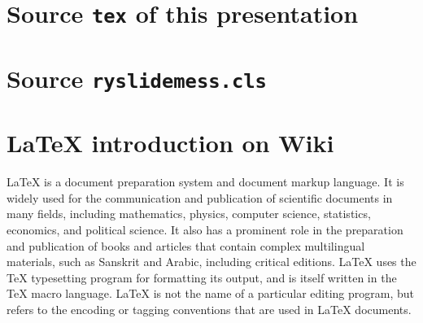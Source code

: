 \documentclass{ryslidemess}
\begin{document}
\newpage\section{Source {\tt tex} of this presentation}
\newpage\section{Source {\tt ryslidemess.cls}}
\newpage\section{\LaTeX{} introduction on Wiki}
\LaTeX{} is a document preparation system and document markup language.
It is widely used for the communication and publication of scientific documents in many fields,
including mathematics, physics, computer science, statistics, economics, and political science.
It also has a prominent role in the preparation and publication of books %
and articles that contain complex multilingual materials,
such as Sanskrit and Arabic, including critical editions.
\LaTeX{} uses the \TeX{} typesetting program for formatting its output,
and is itself written in the \TeX{} macro language.
\LaTeX{} is not the name of a particular editing program,
but refers to the encoding or tagging conventions that are used in \LaTeX{} documents.
\mybackcover
\end{document}
